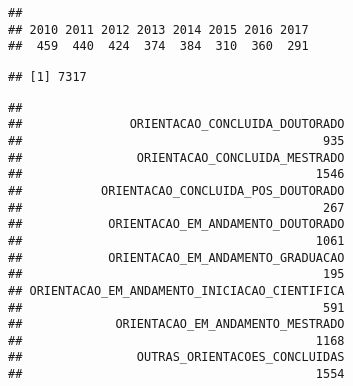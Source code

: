 \documentclass[]{article}
\newenvironment{Shaded}{\begin{snugshade}}{\end{snugshade}}
\newcommand{\KeywordTok}[1]{\textcolor[rgb]{0.13,0.29,0.53}{\textbf{#1}}}
\newcommand{\CommentTok}[1]{\textcolor[rgb]{0.56,0.35,0.01}{\textit{#1}}}
\newcommand{\ControlFlowTok}[1]{\textcolor[rgb]{0.13,0.29,0.53}{\textbf{#1}}}
\newcommand{\OperatorTok}[1]{\textcolor[rgb]{0.81,0.36,0.00}{\textbf{#1}}}
\newcommand{\NormalTok}[1]{#1}
\begin{document}
\begin{verbatim}
## 
## 2010 2011 2012 2013 2014 2015 2016 2017 
##  459  440  424  374  384  310  360  291
\end{verbatim}

\begin{Shaded}
\end{Shaded}

\begin{verbatim}
## [1] 7317
\end{verbatim}

\begin{Shaded}
\end{Shaded}

\begin{verbatim}
## 
##               ORIENTACAO_CONCLUIDA_DOUTORADO 
##                                          935 
##                ORIENTACAO_CONCLUIDA_MESTRADO 
##                                         1546 
##           ORIENTACAO_CONCLUIDA_POS_DOUTORADO 
##                                          267 
##            ORIENTACAO_EM_ANDAMENTO_DOUTORADO 
##                                         1061 
##            ORIENTACAO_EM_ANDAMENTO_GRADUACAO 
##                                          195 
## ORIENTACAO_EM_ANDAMENTO_INICIACAO_CIENTIFICA 
##                                          591 
##             ORIENTACAO_EM_ANDAMENTO_MESTRADO 
##                                         1168 
##                OUTRAS_ORIENTACOES_CONCLUIDAS 
##                                         1554
\end{verbatim}

\begin{Shaded}
\end{Shaded}
\end{document}
